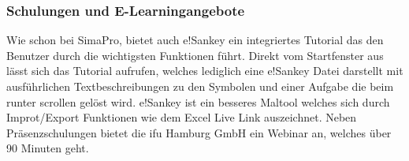\documentclass[a4paper, 12pt, twoside, BCOR=20mm, DIV=calc, abstracton, parskip=half*, toc=bibliography, toc=listof, headsepline, footsepline, headings=small, numbers=enddot]{scrreprt}
\begin{document}
\subsubsection{Schulungen und E-Learningangebote}
Wie schon bei SimaPro, bietet auch e!Sankey ein integriertes Tutorial das den Benutzer durch die wichtigsten Funktionen führt. Direkt vom Startfenster aus lässt sich das Tutorial aufrufen, welches lediglich eine e!Sankey Datei darstellt mit ausführlichen Textbeschreibungen zu den Symbolen und einer Aufgabe die beim runter scrollen gelöst wird. 
e!Sankey ist ein besseres Maltool welches sich durch Improt/Export Funktionen wie dem Excel Live Link auszeichnet. Neben Präsenzschulungen bietet die ifu Hamburg GmbH ein Webinar an, welches über 90 Minuten geht. 
\end{document}
